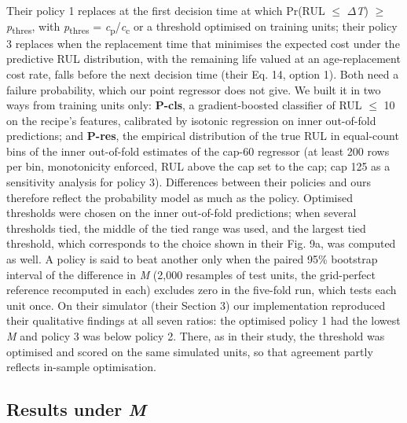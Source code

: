 \documentclass[a4paper,fleqn,doubleblind]{cas-dc}
\begin{document}
Their policy 1 replaces at the first decision time at which Pr(RUL $\le$ $\Delta$\textit{T}) $\ge$ \textit{p}\textsubscript{thres}, with \textit{p}\textsubscript{thres} = \textit{c}\textsubscript{p}/\textit{c}\textsubscript{c} or a threshold optimised on training units; their policy 3 replaces when the replacement time that minimises the expected cost under the predictive RUL distribution, with the remaining life valued at an age-replacement cost rate, falls before the next decision time (their Eq. 14, option 1). Both need a failure probability, which our point regressor does not give. We built it in two ways from training units only: \textbf{P-cls}, a gradient-boosted classifier of RUL $\le$ 10 on the recipe's features, calibrated by isotonic regression on inner out-of-fold predictions; and \textbf{P-res}, the empirical distribution of the true RUL in equal-count bins of the inner out-of-fold estimates of the cap-60 regressor (at least 200 rows per bin, monotonicity enforced, RUL above the cap set to the cap; cap 125 as a sensitivity analysis for policy 3). Differences between their policies and ours therefore reflect the probability model as much as the policy. Optimised thresholds were chosen on the inner out-of-fold predictions; when several thresholds tied, the middle of the tied range was used, and the largest tied threshold, which corresponds to the choice shown in their Fig. 9a, was computed as well. A policy is said to beat another only when the paired 95\% bootstrap interval of the difference in \textit{M} (2,000 resamples of test units, the grid-perfect reference recomputed in each) excludes zero in the five-fold run, which tests each unit once. On their simulator (their Section 3) our implementation reproduced their qualitative findings at all seven ratios: the optimised policy 1 had the lowest \textit{M} and policy 3 was below policy 2. There, as in their study, the threshold was optimised and scored on the same simulated units, so that agreement partly reflects in-sample optimisation.

\subsection{Results under \textit{M}}
\end{document}
